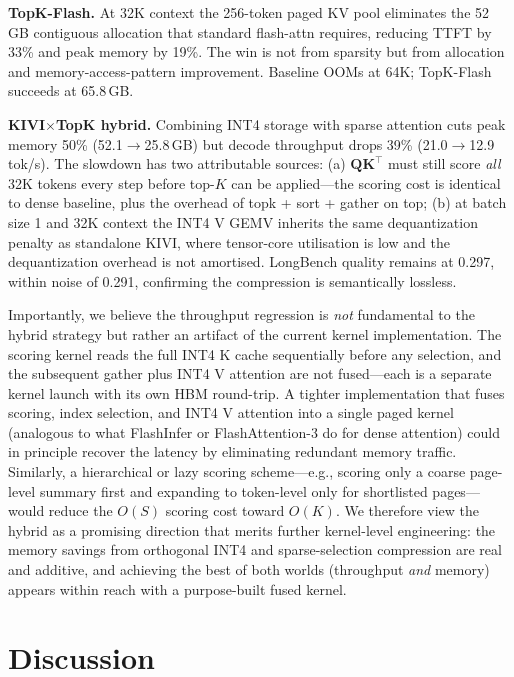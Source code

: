 \documentclass[conference]{IEEEtran}
\begin{document}
\textbf{TopK-Flash.}  At 32K context the 256-token paged KV pool
eliminates the 52\,GB contiguous allocation that standard flash-attn
requires, reducing TTFT by 33\% and peak memory by 19\%.  The win is
not from sparsity but from allocation and memory-access-pattern
improvement.  Baseline OOMs at 64K; TopK-Flash succeeds at 65.8\,GB.

\textbf{KIVI$\times$TopK hybrid.}  Combining INT4 storage with sparse
attention cuts peak memory 50\% (52.1$\rightarrow$25.8\,GB) but decode
throughput drops 39\% (21.0$\rightarrow$12.9\,tok/s).  The slowdown has
two attributable sources: (a) $\mathbf{Q}\mathbf{K}^\top$ must still
score \emph{all} 32K tokens every step before top-$K$ can be
applied---the scoring cost is identical to dense baseline, plus the
overhead of topk + sort + gather on top; (b) at batch size 1 and 32K
context the INT4 V GEMV inherits the same dequantization penalty as
standalone KIVI, where tensor-core utilisation is low and the
dequantization overhead is not amortised.  LongBench quality remains
at 0.297, within noise of 0.291, confirming the compression is
semantically lossless.

Importantly, we believe the throughput regression is \emph{not}
fundamental to the hybrid strategy but rather an artifact of the
current kernel implementation.  The scoring kernel reads the full INT4
K cache sequentially before any selection, and the subsequent gather
plus INT4 V attention are not fused---each is a separate kernel launch
with its own HBM round-trip.  A tighter implementation that fuses
scoring, index selection, and INT4 V attention into a single paged
kernel (analogous to what FlashInfer or FlashAttention-3 do for dense
attention) could in principle recover the latency by eliminating
redundant memory traffic.  Similarly, a hierarchical or lazy scoring
scheme---e.g., scoring only a coarse page-level summary first and
expanding to token-level only for shortlisted pages---would reduce the
$O(S)$ scoring cost toward $O(K)$.  We therefore view the hybrid as a
promising direction that merits further kernel-level engineering: the
memory savings from orthogonal INT4 and sparse-selection compression
are real and additive, and achieving the best of both worlds
(throughput \emph{and} memory) appears within reach with a
purpose-built fused kernel.

\section{Discussion}
\end{document}
